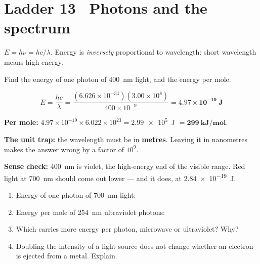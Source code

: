 \documentclass{apchem-worksheet}
\begin{document}
\section*{\sffamily Ladder 13 \textbullet\ Photons and the spectrum}
 

$E = h\nu = hc/\lambda$. Energy is \emph{inversely} proportional to
wavelength: short wavelength means high energy.

\begin{workedexample}
Find the energy of one photon of \SI{400}{\nano\metre} light, and the
energy per mole.

\[ E = \frac{hc}{\lambda} =
   \frac{(6.626\times10^{-34})(3.00\times10^{8})}{400\times10^{-9}}
   = \mathbf{4.97\times10^{-19}~J} \]

\textbf{Per mole:} $4.97\times10^{-19} \times 6.022\times10^{23} =
\num{2.99e5}$~J $= \mathbf{299~kJ/mol}$.

\textbf{The unit trap:} the wavelength must be in \textbf{metres}.
Leaving it in nanometres makes the answer wrong by a factor of
$10^{9}$.

\textbf{Sense check:} \SI{400}{\nano\metre} is violet, the high-energy end
of the visible range. Red light at \SI{700}{\nano\metre} should come out
lower --- and it does, at \SI{2.84e-19}{\joule}.
\end{workedexample}

\begin{yourturn}
\begin{enumerate}[leftmargin=*,itemsep=0.5em]
  \item Energy of one photon of \SI{700}{\nano\metre} light:
        \workspace[1.8cm]
  \item Energy per mole of \SI{254}{\nano\metre} ultraviolet photons:
        \workspace[1.8cm]
  \item Which carries more energy per photon, microwave or ultraviolet?
        Why? \workspace[1.6cm]
  \item Doubling the intensity of a light source does not change whether
        an electron is ejected from a metal. Explain. \workspace[2.0cm]
\end{enumerate}
\end{yourturn}
\end{document}
